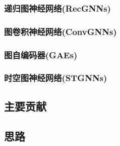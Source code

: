 \subsubsection{递归图神经网络(RecGNNs)}
\subsubsection{图卷积神经网络(ConvGNNs)}
\subsubsection{图自编码器(GAEs)}
\subsubsection{时空图神经网络(STGNNs)}

\subsection{主要贡献}
\subsection{思路}



